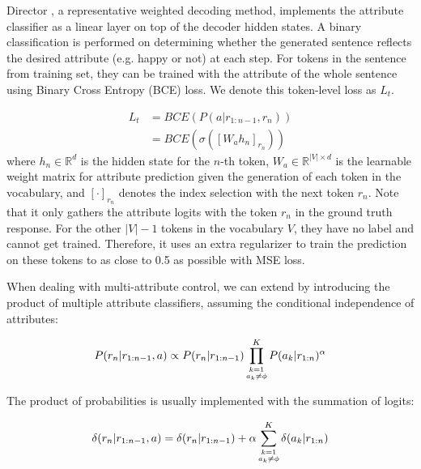 Director \citep{arora2022director}, a representative weighted decoding method, implements the attribute classifier as a linear layer on top of the decoder hidden states. A binary classification is performed on determining whether the generated sentence reflects the desired attribute (e.g. happy or not) at each step. For tokens in the sentence from training set, they can be trained with the attribute of the whole sentence using Binary Cross Entropy (BCE) loss. We denote this token-level loss as $L_{t}$. 

\begin{equation}
    \begin{aligned}
        L_{t} &= BCE(P(a | r_{1:n-1}, r_n)) \\
                  &= BCE(\sigma([W_a h_n]_{r_n}))
    \end{aligned}
    \label{eqn:clf_t}
\end{equation}
where $h_n \in \mathbb{R}^{d}$ is the hidden state for the $n$-th token, $W_a \in \mathbb{R}^{|V| \times d}$ is the learnable weight matrix for attribute prediction given the generation of each token in the vocabulary, and $[\cdot]_{r_n}$ denotes the index selection with the next token $r_n$. 
Note that it only gathers the attribute logits with the token $r_n$ 
in the ground truth response. For the other $|V|-1$ tokens in the vocabulary 
$V$, they have no label and cannot get trained. Therefore, it uses an 
extra regularizer to train the prediction on these tokens to as close to 
0.5 as possible with MSE loss.  

When dealing with multi-attribute control, we can extend 
 by introducing the product of multiple attribute 
classifiers, assuming the conditional independence of attributes:

\begin{equation}
    \small
    P(r_n|r_{1:n-1}, a) \propto P(r_n|r_{1:n-1}) \prod_{\substack{k=1\\a_k\ne \phi}}^{K} P(a_k|r_{1:n})^{\alpha}
    \label{eqn:multi_wd}
\end{equation}

The product of probabilities is usually implemented with the 
summation of logits: 

\begin{equation}
    \small
    \delta(r_n|r_{1:n-1}, a) = \delta(r_n|r_{1:n-1}) + \alpha \sum_{\substack{k=1\\a_k\ne \phi}}^{K} \delta(a_k|r_{1:n})
    \label{eqn:multi_wd_logits}
\end{equation}


